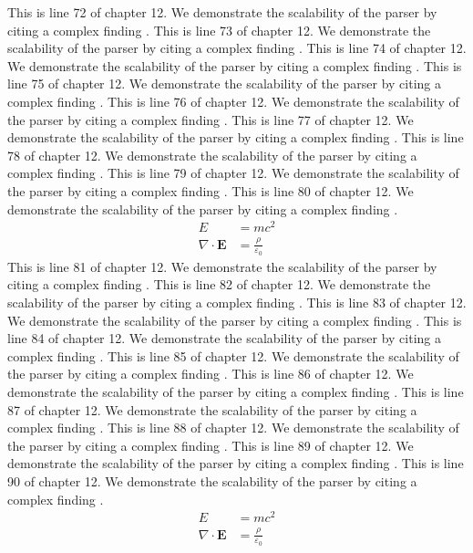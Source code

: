 This is line 72 of chapter 12. We demonstrate the scalability of the parser by citing a complex finding \cite{ref12_72}.
This is line 73 of chapter 12. We demonstrate the scalability of the parser by citing a complex finding \cite{ref12_73}.
This is line 74 of chapter 12. We demonstrate the scalability of the parser by citing a complex finding \cite{ref12_74}.
This is line 75 of chapter 12. We demonstrate the scalability of the parser by citing a complex finding \cite{ref12_75}.
This is line 76 of chapter 12. We demonstrate the scalability of the parser by citing a complex finding \cite{ref12_76}.
This is line 77 of chapter 12. We demonstrate the scalability of the parser by citing a complex finding \cite{ref12_77}.
This is line 78 of chapter 12. We demonstrate the scalability of the parser by citing a complex finding \cite{ref12_78}.
This is line 79 of chapter 12. We demonstrate the scalability of the parser by citing a complex finding \cite{ref12_79}.
This is line 80 of chapter 12. We demonstrate the scalability of the parser by citing a complex finding \cite{ref12_80}.
\begin{align*}
  E &= mc^2 \\
  \nabla \cdot \mathbf{E} &= \frac{\rho}{\varepsilon_0}
\end{align*}
This is line 81 of chapter 12. We demonstrate the scalability of the parser by citing a complex finding \cite{ref12_81}.
This is line 82 of chapter 12. We demonstrate the scalability of the parser by citing a complex finding \cite{ref12_82}.
This is line 83 of chapter 12. We demonstrate the scalability of the parser by citing a complex finding \cite{ref12_83}.
This is line 84 of chapter 12. We demonstrate the scalability of the parser by citing a complex finding \cite{ref12_84}.
This is line 85 of chapter 12. We demonstrate the scalability of the parser by citing a complex finding \cite{ref12_85}.
This is line 86 of chapter 12. We demonstrate the scalability of the parser by citing a complex finding \cite{ref12_86}.
This is line 87 of chapter 12. We demonstrate the scalability of the parser by citing a complex finding \cite{ref12_87}.
This is line 88 of chapter 12. We demonstrate the scalability of the parser by citing a complex finding \cite{ref12_88}.
This is line 89 of chapter 12. We demonstrate the scalability of the parser by citing a complex finding \cite{ref12_89}.
This is line 90 of chapter 12. We demonstrate the scalability of the parser by citing a complex finding \cite{ref12_90}.
\begin{align*}
  E &= mc^2 \\
  \nabla \cdot \mathbf{E} &= \frac{\rho}{\varepsilon_0}
\end{align*}
